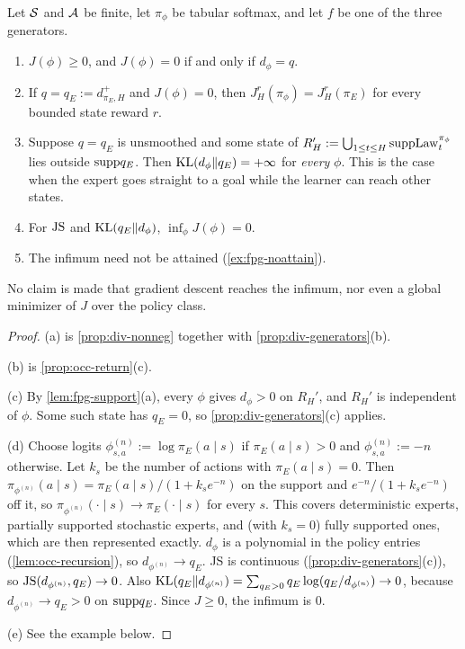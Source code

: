 \begin{proposition}\label{prop:fpg-opt}
Let $\mathcal{S}$ and $\mathcal{A}$ be finite, let $\pi_\phi$ be tabular softmax, and let $f$ be one of the three generators.
\begin{enumerate}[nosep,label=(\alph*)]
\item $J(\phi)\ge0$, and $J(\phi)=0$ if and only if $d_\phi=q$.
\item If $q=q_E:=d^+_{\pi_E,H}$ and $J(\phi)=0$, then $J^r_H(\pi_\phi)=J^r_H(\pi_E)$ for every bounded state reward $r$.
\item Suppose $q=q_E$ is unsmoothed and some state of $R_H':=\bigcup_{1\le t\le H}\mathrm{supp}\mathrm{Law}^{\pi_\phi}_t$ lies outside $\mathrm{supp} q_E$. Then $\mathrm{KL}(d_\phi\Vert q_E)=+\infty$ for \emph{every} $\phi$. This is the case when the expert goes straight to a goal while the learner can reach other states.
\item For $\mathrm{JS}$ and $\mathrm{KL}(q_E\Vert d_\phi)$, $\inf_\phi J(\phi)=0$.
\item The infimum need not be attained (\cref{ex:fpg-noattain}).
\end{enumerate}
No claim is made that gradient descent reaches the infimum, nor even a global minimizer of $J$ over the policy class.
\end{proposition}
\begin{proof}
(a) is \cref{prop:div-nonneg} together with \cref{prop:div-generators}(b).

(b) is \cref{prop:occ-return}(c).

(c) By \cref{lem:fpg-support}(a), every $\phi$ gives $d_\phi>0$ on $R_H'$, and $R_H'$ is independent of $\phi$. Some such state has $q_E=0$, so \cref{prop:div-generators}(c) applies.

(d) Choose logits $\phi^{(n)}_{s,a}:=\log\pi_E(a\mid s)$ if $\pi_E(a\mid s)>0$ and $\phi^{(n)}_{s,a}:=-n$ otherwise.
Let $k_s$ be the number of actions with $\pi_E(a\mid s)=0$.
Then $\pi_{\phi^{(n)}}(a\mid s)=\pi_E(a\mid s)/(1+k_se^{-n})$ on the support and $e^{-n}/(1+k_se^{-n})$ off it, so $\pi_{\phi^{(n)}}(\cdot\mid s)\to\pi_E(\cdot\mid s)$ for every $s$.
This covers deterministic experts, partially supported stochastic experts, and (with $k_s=0$) fully supported ones, which are then represented exactly.
$d_\phi$ is a polynomial in the policy entries (\cref{lem:occ-recursion}), so $d_{\phi^{(n)}}\to q_E$.
JS is continuous (\cref{prop:div-generators}(c)), so $\mathrm{JS}(d_{\phi^{(n)}},q_E)\to0$.
Also $\mathrm{KL}(q_E\Vert d_{\phi^{(n)}})=\sum_{q_E>0}q_E\log(q_E/d_{\phi^{(n)}})\to0$, because $d_{\phi^{(n)}}\to q_E>0$ on $\mathrm{supp} q_E$.
Since $J\ge0$, the infimum is $0$.

(e) See the example below.
\end{proof}

